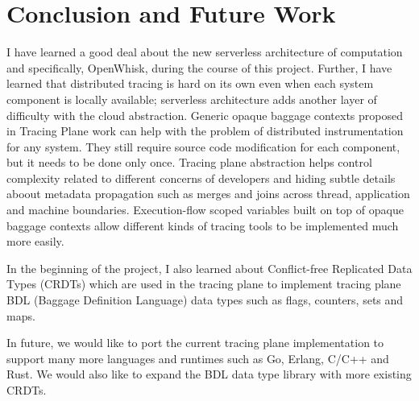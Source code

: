 \chapter{Conclusion and Future Work}

I have learned a good deal about the new serverless architecture of computation and specifically, OpenWhisk, during the course of this project. Further, I have learned that distributed tracing is hard on its own even when each system component is locally available; serverless architecture adds another layer of difficulty with the cloud abstraction. Generic opaque baggage contexts proposed in Tracing Plane work can help with the problem of distributed instrumentation for any system. They still require source code modification for each component, but it needs to be done only once. Tracing plane abstraction helps control complexity related to different concerns of developers and hiding subtle details aboout metadata propagation such as merges and joins across thread, application and machine boundaries. Execution-flow scoped variables built on top of opaque baggage contexts allow different kinds of tracing tools to be implemented much more easily.

In the beginning of the project, I also learned about Conflict-free Replicated Data Types (CRDTs)\cite{Shapiro:2011:CRD:2050613.2050642} which are used in the tracing plane to implement tracing plane BDL (Baggage Definition Language) data types such as flags, counters, sets and maps.

In future, we would like to port the current tracing plane implementation to support many more languages and runtimes such as Go, Erlang, C/C++ and Rust. We would also like to expand the BDL data type library with more existing CRDTs\cite{shapiro:inria-00555588}.
